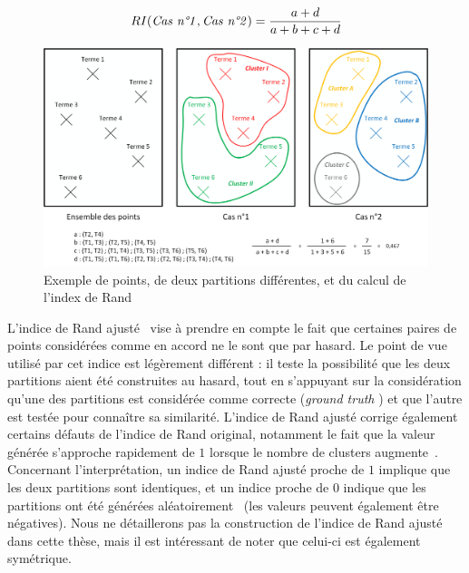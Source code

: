 \begin{equation}
RI(\text{\textit{Cas n°1}}, \text{\textit{Cas n°2}}) = \frac{a + d}{a + b + c + d}
\label{equation:4-RandIndex}
\end{equation}


\bigskip


\begin{figure}[ht]
\centering
\centerline{  %
\includegraphics[scale=0.55]{4-Experiences/images/cas-5/RandIndex-formula.png}
}
\caption{Exemple de points, de deux partitions différentes, et du calcul de l'index de Rand}
\label{figure:4-RandIndex}
\end{figure}

\bigskip

L'indice de Rand ajusté~\cite{hubert1985comparing} vise à prendre en compte le fait que certaines paires de points considérées comme en accord ne le sont que par hasard.
Le point de vue utilisé par cet indice est légèrement différent : il teste la possibilité que les deux partitions aient été construites au hasard, tout en s'appuyant sur la considération qu'une des partitions est considérée comme correcte (\og \textit{ground truth} \fg) et que l'autre est testée pour connaître sa similarité.
L'indice de Rand ajusté corrige également certains défauts de l'indice de Rand original, notamment le fait que la valeur générée s'approche rapidement de $ 1 $ lorsque le nombre de clusters augmente~\cite{quere:tel-00950514}.
Concernant l'interprétation, un indice de Rand ajusté proche de $ 1 $ implique que les deux partitions sont identiques, et un indice proche de $ 0 $ indique que les partitions ont été générées aléatoirement~\cite{quere:tel-00950514} (les valeurs peuvent également être négatives).
Nous ne détaillerons pas la construction de l'indice de Rand ajusté dans cette thèse, mais il est intéressant de noter que celui-ci est également symétrique.




